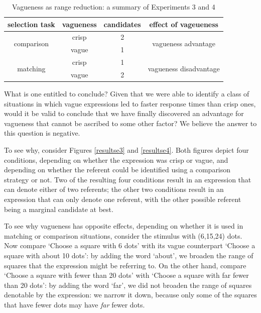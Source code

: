 \documentclass[%
man,		%
floatsintext,%
apacite%
]{apa6}
\begin{document}
\begin{table}[htbp]
\caption{Vagueness as range reduction: a summary of Experiments 3 and 4}
\label{Vagueness as range reduction}
\centering
\begin{tabular}{cccc}
selection task 				& vagueness		& candidates	& effect of vageueness	\\
\toprule
\multirow{ 2}{*}{comparison} 	& crisp 			& 2			& \multirow{ 2}{*}{vagueness advantage}  		\\
\cline{2-3}
  						& vague			& 1			&                                               				\\
\midrule
\multirow{ 2}{*}{matching} 		& crisp 			& 1 			&\multirow{ 2}{*}{vagueness disadvantage}	\\
\cline{2-3}
 						& vague			& 2			&								 	\\
\bottomrule
\end{tabular}
\end{table}

What is one entitled to conclude? Given that we were able to identify a class of situations in which vague expressions led to faster response times than crisp ones, would it be valid to conclude that we have finally discovered an advantage for vagueness that cannot be ascribed to some other factor? We believe the answer to this question is negative. 

To see why, consider Figures \ref{resultse3} and \ref{resultse4}. Both figures depict four conditions, depending on whether the expression was crisp or vague, and depending on whether the referent could be identified using a comparison strategy or not. Two of the resulting four conditions result in an expression that can denote either of two referents; the other two conditions result in an expression that can only denote one referent, with the other possible referent being a marginal candidate at best.


To see why vagueness has opposite effects, depending on whether it is used in matching or comparison situations, consider the stimulus with (6,15,24) dots. Now compare `Choose a square with 6 dots' with its vague counterpart `Choose a square with about 10 dots': by adding the word `about', we broaden the range of squares that the expression might be referring to. On the other hand, compare `Choose a square with fewer than 20 dots' with `Choose a square with far fewer than 20 dots': by adding the word `far', we did not broaden the range of squares denotable by the expression: we narrow it down, because only some of the squares that have fewer dots may have {\em far} fewer dots.
\end{document}
